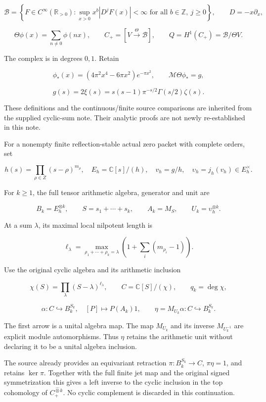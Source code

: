 \[
\mathscr B=\left\{F\in C^\infty(\mathbb R_{>0}):
\sup_{x>0}x^b|D^jF(x)|<\infty\text{ for all }b\in\mathbb Z,\ j\geq0\right\},
\qquad D=-x\partial_x,
\]

\[
\Theta\phi(x)=\sum_{n\ne0}\phi(nx),
\qquad C_+=[V\xrightarrow{\Theta}\mathscr B],
\qquad Q=H^1(C_+)=\mathscr B/\Theta V.
\]

The complex is in degrees \(0,1\). Retain

\[
\phi_*(x)=(4\pi^2x^4-6\pi x^2)e^{-\pi x^2},
\qquad
\mathcal M\Theta\phi_*=g,
\]

\[
\boxed{
g(s)=2\xi(s)=s(s-1)\pi^{-s/2}\Gamma(s/2)\zeta(s).
}
\]

These definitions and the continuous/finite source comparisons are
inherited from the supplied cyclic-sum note. Their analytic proofs are
not newly re-established in this note.

For a nonempty finite reflection-stable actual zero packet with complete
orders, set

\[
h(s)=\prod_{\rho\in Z}(s-\rho)^{m_\rho},\quad
E_h=\mathbb C[s]/(h),\quad
v_h=g/h,\quad \upsilon_h=j_h(v_h)\in E_h^\times.
\]

For \(k\geq1\), the full tensor arithmetic algebra, generator and unit
are

\[
B_k=E_h^{\otimes k},\qquad
S=s_1+\cdots+s_k,\qquad A_k=M_S,\qquad U_k=\upsilon_h^{\otimes k}.
\]

At a sum \(\lambda\), its maximal local nilpotent length is

\[
\ell_\lambda=
\max_{\rho_1+\cdots+\rho_k=\lambda}
\left(1+\sum_i(m_{\rho_i}-1)\right).
\]

Use the original cyclic algebra and its arithmetic inclusion

\[
\chi(S)=\prod_\lambda(S-\lambda)^{\ell_\lambda},
\qquad C=\mathbb C[S]/(\chi),\qquad q_k=\deg\chi,
\]

\[
\alpha:C\hookrightarrow B_k^{S_k},\quad[P]\mapsto P(A_k)1,
\qquad
\eta=M_{U_k}\alpha:C\hookrightarrow B_k^{S_k}.
\]

The first arrow is a unital algebra map. The map \(M_{U_k}\) and its
inverse \(M_{U_k^{-1}}\) are explicit module automorphisms. Thus
\(\eta\) retains the arithmetic unit without declaring it to be a unital
algebra inclusion.

The source already provides an equivariant retraction
\(\pi:B_k^{S_k}\to C\), \(\pi\eta=1\), and retains \(\ker\pi\). Together
with the full finite jet map and the original signed symmetrization this
gives a left inverse to the cyclic inclusion in the top cohomology of
\(C_+^{\widehat\otimes k}\). No cyclic complement is discarded in this
continuation.


